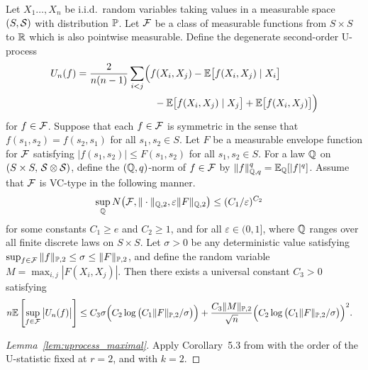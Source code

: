 \begin{lemma}
  \label{lem:uprocess_maximal}

  Let $X_1 \ldots, X_n$
  be i.i.d.\ random variables taking values
  in a measurable space $(S, \cS)$
  with distribution $\P$.
  Let $\cF$ be a class of measurable functions from
  $S \times S$ to $\R$ which is also pointwise measurable.
  Define the degenerate second-order U-process
  \begin{align*}
    U_n(f)
    =
    \frac{2}{n(n-1)}
    \sum_{i<j}
    &\Big(
      f(X_i, X_j)
      - \E\big[f(X_i,X_j) \mid X_i\big] \\
      &\quad-
      \E\big[f(X_i,X_j) \mid X_j\big]
      + \E\big[f(X_i,X_j)\big]
    \Big)
  \end{align*}
  for $f \in \cF$.
  Suppose that each $f \in \cF$ is symmetric in the sense that
  $f(s_1,s_2) = f(s_2,s_1)$
  for all $s_1, s_2 \in S$.
  Let $F$ be a measurable envelope function for $\cF$
  satisfying $|f(s_1,s_2)| \leq F(s_1,s_2)$
  for all $s_1,s_2 \in S$.
  For a law $\Q$ on
  $(S \times S, \, \cS \otimes \cS)$,
  define the $(\Q,q)$-norm of $f \in \cF$ by
  $\|f\|_{\Q,q}^q = \E_\Q[|f|^q]$.
  Assume that $\cF$ is VC-type in the following manner.
  \begin{align*}
    \sup_\Q
    N\big(
      \cF, \|\cdot\|_{\Q,2}, \varepsilon \|F\|_{\Q,2}
    \big)
    &\leq
    (C_1/\varepsilon)^{C_2}
  \end{align*}
  for some constants
  $C_1 \geq e$
  and
  $C_2 \geq 1$,
  and for all $\varepsilon \in (0,1]$,
  where $\Q$ ranges over all finite discrete laws
  on
  $S \times S$.
  Let $\sigma > 0$ be any deterministic value satisfying
  $\sup_{f \in \cF} \|f\|_{\P,2} \leq \sigma \leq \|F\|_{\P,2}$,
  and define the random variable $M = \max_{i,j} |F(X_i, X_j)|$.
  Then there exists a universal constant $C_3 > 0$
  satisfying
  \begin{align*}
    n
    \E\left[
      \sup_{f \in \cF}
      \big| U_n(f) \big|
    \right]
    &\leq
    C_3 \sigma
    \Big(
      C_2 \log\big(C_1 \|F\|_{\P,2} / \sigma \big)
    \Big)
    + \frac{C_3 \|M\|_{\P,2}}{\sqrt{n}}
    \Big(
      C_2 \log\big(C_1 \|F\|_{\P,2} / \sigma \big)
    \Big)^2.
  \end{align*}

\end{lemma}

\begin{proof}[Lemma~\ref{lem:uprocess_maximal}]

  Apply Corollary~5.3
  from \citet{chen2020jackknife}
  with the order of the U-statistic fixed at
  $r=2$,
  and with $k=2$.
\end{proof}


